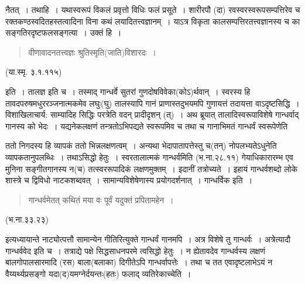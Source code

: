 \documentclass[11pt, openany]{book}
\begin{document}
नैतत्~। तथाहि~। यथास्वरूपं विकलं प्रवृत्तो विधिः फलं प्रसूते~। शारीरपौ (दा) रवस्वरस्वरूपसम्पत्तिरेव च रक्तकण्ठस्वदितहस्तत्वादिना विना कथं लयादितत्त्वज्ञानम्~। याऽत्र विकृता कालसम्पत्तिरतत्त्वज्ञानस्य च का सङ्गतिरदृष्टफलसङ्गत्या~। उक्तं हि~। 

\begin{quote}
{\qt वीणावादनतत्त्वज्ञः श्रुतिस्मृति(जाति)विशारदः~। }
\end{quote}

\begin{center}
 (या.स्मृ. ३.१.११५) 
\end{center}

\noindent
इति~। {\qtt तालज्ञ} इति च~। तस्माद् गान्धर्वे सुतरां गुणदोषविवेका(कोऽ)र्थवान्~। स्वरस्य हि तावदपरुषमधुररञ्जनात्मकमेव लघुः(घु) तालस्यापि गानं प्राणास्तदुभयमपि गुणायत्तं तदायत्ता वाऽदृष्टसिद्धि~। {\qtt विशाखिलाचार्य}: साम्यादिह सिद्धिः परत्रेति वदन् प्रादीदृशन् (त्)~। अथ ब्रूयात् तालादिस्वरूपाविशेषे गान्धर्वाद् गानस्य को भेदः~। यद्यनेकलक्षणं तन्त्रतोऽभिपद्यते स्वरूपमिव च तथा च गानाभिमतं गान्धर्वं स्वरूपेणेति

\newpage

\noindent
ततो निगदस्य हि व्यापकं ततो भिन्नलक्षणत्वम्~। अन्यथा भेदापातापत्तेस्तु च(तन्) नोपलभ्यतेऽधुनेति व्यापकतानुपलब्धिः~। तथाऽसिद्धो हेतुः~। {\qtt स्वरतालात्मकं गान्धर्वमिति} (भ.ना.२८.११) गेयाधिकारारम्भ एव मुनिना सङ्गीतगानस्य न(च) तत्स्वररूपादिकं लक्षणमुक्तम्~। इदानीं तत्रोच्यते~। इहायं गान्धर्वशब्दो लोके शास्त्रे च द्विविधो नाटकशब्दवत्~। सामान्यविशेषेणास्य प्रयोगदर्शनात्~। गान्धर्विक इति~।

\begin{quote}
{\qt गान्धर्वमेतत् कथितं मया वः पूर्वं यदुक्तं प्रपितामहेन~।}
\end{quote}

\begin{center}
(भ.ना.३३.२३)
\end{center}

\noindent
इत्यध्यायान्ते नाट्योत्पत्तौ सामान्येन गीतिरित्युक्ते गान्धर्वं गानमपि~। अत्र विशेषे तु गान्धर्वः~। अत्रेत्यादौ गान्धर्ववेद इति च~। तत्राद्ये पक्षे सिद्धसाधनपरमे त्वसिद्धो हेतुः~। न ह्येतावदेव गान्धर्वस्य लक्षणं बालगोपालसारमादि (रस) बाला(बलाका) दिगीतेऽपि गान्धर्वापत्तेः~। तथा च तत एवादृष्टलाभेऽयं न वैय्यर्थ्यप्रसङ्गो यदा(द)यमग्नेर्दयन्तः(हतः) फलाद् व्यतिरेकाच्चेति~।\\
\end{document}

